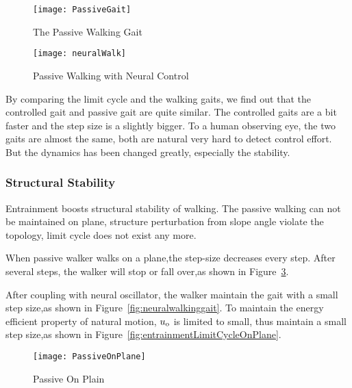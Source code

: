 \begin{figure}[!htbp]
  \begin{center}
     \texttt{[image: PassiveGait]}
    \caption{The Passive Walking Gait}
    \label{fig:passivegait}
\end{center}
\end{figure}

\begin{figure}[!htbp]
  \begin{center}
     \texttt{[image: neuralWalk]}
    \caption{Passive Walking with Neural Control}
    \label{fig:entrainmentgait}
\end{center}
\end{figure}

By comparing the limit cycle and the walking gaits, we find out that the controlled gait and passive gait are quite similar.
The controlled gaits are a bit faster and the step size is a slightly bigger.
To a human observing eye, the two gaits are almost the same, both are natural very hard to detect control effort.
But the dynamics has been changed greatly, especially the stability.



\subsubsection*{Structural Stability}
Entrainment  boosts structural stability of walking. 
The passive walking can not be maintained on plane, structure perturbation from slope angle violate the topology, limit cycle does not exist any more.


When passive walker walks on a plane,the step-size decreases every step.
After several steps, the walker will stop or fall over,as shown in Figure~\ref{fig:passivegaitplane}.

After coupling with neural oscillator, the  walker maintain the gait with a small step size,as shown in Figure~\ref{fig:neuralwalkinggait}.
To maintain the energy efficient property of natural motion, $u_{\mathrm{o}}$ is limited to small, thus maintain a small step size,as shown in Figure~\ref{fig:entrainmentLimitCycleOnPlane}.

\begin{figure}[!htbp]
  \begin{center}
    \texttt{[image: PassiveOnPlane]}
    \caption{Passive On Plain}
    \label{fig:passivegaitplane}
\end{center}
\end{figure}

